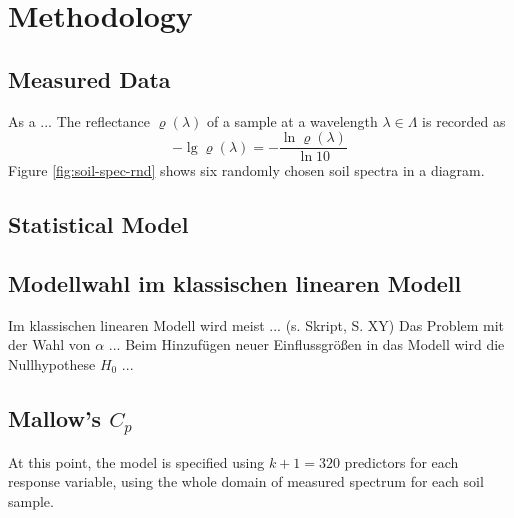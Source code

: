 \section{Methodology}
\label{sec:methodology}
	
	\subsection{Measured Data}
	\label{ssec:measured-data}
	
		As a ...
		The reflectance $\varrho(\lambda)$ of a sample at a wavelength $\lambda \in \Lambda$ is recorded as
		\[
			-\lg \varrho(\lambda) = -\frac{\ln \varrho(\lambda)}{\ln 10}
		\]
		Figure \ref{fig:soil-spec-rnd} shows six randomly chosen soil spectra in a diagram.
		\begin{figure*}
			\centering
			
			\caption{Six near infrared soil spectra of randomly chosen soil samples obtained from the data set, where $\lambda$ is the wavelength and $\rho(\lambda)$ the corresponding reflectance and each colour refers to one sample}
			\label{fig:soil-spec-rnd}
		\end{figure*}
		
	

	\subsection{Statistical Model}
	\label{ssec:statistical-model}
	
	
	

	

	\subsection{Modellwahl im klassischen linearen Modell}
	\label{ssec:mlr}
	Im klassischen linearen Modell wird meist ... (s. Skript, S. XY)
	Das Problem mit der Wahl von $\alpha$ ...
	Beim Hinzufügen neuer Einflussgrößen in das Modell wird die Nullhypothese $H_0$ ...
	
		


	\subsection{Mallow's $C_{p}$}
	\label{ssec:mallows-C_p}
	
		At this point, the model is specified using $k+1 = 320$ predictors for each response variable, using the whole domain of measured spectrum for each soil sample.
		
